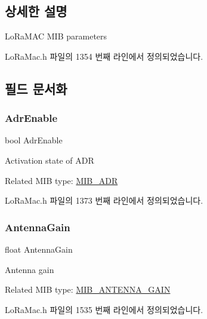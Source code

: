 \subsection{상세한 설명}
Lo\+Ra\+M\+AC M\+IB parameters 

Lo\+Ra\+Mac.\+h 파일의 1354 번째 라인에서 정의되었습니다.



\subsection{필드 문서화}
\mbox{\label{unionu_mib_param_a04efa8698eeea64f27b216d64e598c0d}} 
\subsubsection{\texorpdfstring{Adr\+Enable}{AdrEnable}}
{\footnotesize\ttfamily bool Adr\+Enable}

Activation state of A\+DR

Related M\+IB type\+: \mbox{\hyperlink{group___l_o_r_a_m_a_c_gga32ea83d13a3f5bb4b3ec2ace2319ab61a756ff0b66217e3e4ddd0442c8aa56802}{M\+I\+B\+\_\+\+A\+DR}} 

Lo\+Ra\+Mac.\+h 파일의 1373 번째 라인에서 정의되었습니다.

\mbox{\label{unionu_mib_param_a727eaefd87f898a5238118573968962c}} 
\subsubsection{\texorpdfstring{Antenna\+Gain}{AntennaGain}}
{\footnotesize\ttfamily float Antenna\+Gain}

Antenna gain

Related M\+IB type\+: \mbox{\hyperlink{group___l_o_r_a_m_a_c_gga32ea83d13a3f5bb4b3ec2ace2319ab61a268b2f7da53dbc25655a7bdcc7e6128e}{M\+I\+B\+\_\+\+A\+N\+T\+E\+N\+N\+A\+\_\+\+G\+A\+IN}} 

Lo\+Ra\+Mac.\+h 파일의 1535 번째 라인에서 정의되었습니다.

\mbox{\label{unionu_mib_param_a46a2c1c82bda378fb02d20db36bbe414}} 
